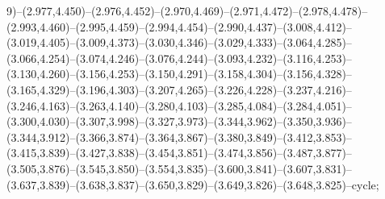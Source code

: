 9)--(2.977,4.450)--(2.976,4.452)--(2.970,4.469)--(2.971,4.472)--(2.978,4.478)--(2.993,4.460)--(2.995,4.459)--(2.994,4.454)--(2.990,4.437)--(3.008,4.412)--(3.019,4.405)--(3.009,4.373)--(3.030,4.346)--(3.029,4.333)--(3.064,4.285)--(3.066,4.254)--(3.074,4.246)--(3.076,4.244)--(3.093,4.232)--(3.116,4.253)--(3.130,4.260)--(3.156,4.253)--(3.150,4.291)--(3.158,4.304)--(3.156,4.328)--(3.165,4.329)--(3.196,4.303)--(3.207,4.265)--(3.226,4.228)--(3.237,4.216)--(3.246,4.163)--(3.263,4.140)--(3.280,4.103)--(3.285,4.084)--(3.284,4.051)--(3.300,4.030)--(3.307,3.998)--(3.327,3.973)--(3.344,3.962)--(3.350,3.936)--(3.344,3.912)--(3.366,3.874)--(3.364,3.867)--(3.380,3.849)--(3.412,3.853)--(3.415,3.839)--(3.427,3.838)--(3.454,3.851)--(3.474,3.856)--(3.487,3.877)--(3.505,3.876)--(3.545,3.850)--(3.554,3.835)--(3.600,3.841)--(3.607,3.831)--(3.637,3.839)--(3.638,3.837)--(3.650,3.829)--(3.649,3.826)--(3.648,3.825)--cycle;
